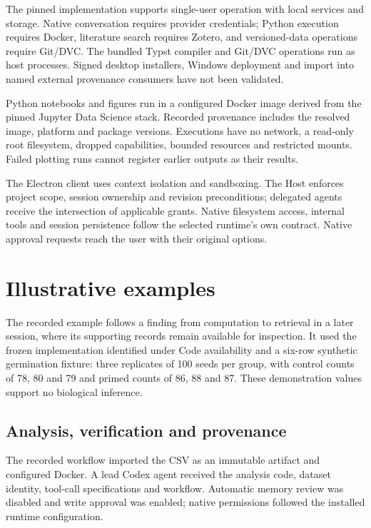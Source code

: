 \documentclass[preprint,12pt,a4paper]{elsarticle}
\begin{document}
The pinned implementation supports single-user operation with local services and storage.
Native conversation requires provider credentials; Python execution requires Docker,
literature search requires Zotero, and versioned-data operations require Git/DVC.
The bundled Typst compiler and Git/DVC operations run as host processes. Signed desktop
installers, Windows deployment and import into named external provenance consumers have
not been validated.

Python notebooks and figures run in a configured Docker image derived from the pinned Jupyter
Data Science stack. Recorded provenance includes the resolved image, platform and package
versions. Executions have no network, a read-only root filesystem, dropped capabilities,
bounded resources and restricted mounts. Failed plotting runs cannot register earlier outputs
as their results.

The Electron client uses context isolation and sandboxing. The Host enforces project scope,
session ownership and revision preconditions; delegated agents receive the intersection of
applicable grants. Native filesystem access, internal tools and session persistence follow
the selected runtime's own contract. Native approval requests reach the user with their
original options.

\section{Illustrative examples}
\label{sec:examples}

The recorded example follows a finding from computation to retrieval in a later session, where its
supporting records remain available for inspection. It used the frozen implementation identified
under Code availability and a six-row synthetic germination fixture: three replicates
of 100 seeds per group, with control counts of 78, 80 and 79 and primed counts of 86, 88 and 87.
These demonstration values support no biological inference.

\subsection{Analysis, verification and provenance}

The recorded workflow imported the CSV as an immutable artifact and configured Docker.
A lead Codex agent received the analysis code, dataset identity, tool-call specifications and
workflow. Automatic memory review was disabled and write approval was enabled; native permissions
followed the installed runtime configuration.
\end{document}
